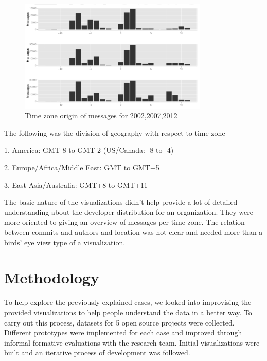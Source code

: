 \documentclass[double,12pt]{beavtex}
\begin{document}
\begin{figure}[!ht]
\centering
\includegraphics[width=90mm]{work2.png}
\caption{Time zone origin of messages for 2002,2007,2012}
\end{figure}

The following was the division of geography with respect to time zone -

1. America: GMT-8 to GMT-2 (US/Canada: -8 to -4)

2. Europe/Africa/Middle East: GMT to GMT+5

3. East Asia/Australia: GMT+8 to GMT+11


The basic nature of the visualizations didn't help provide a lot of detailed understanding about the developer distribution for an organization. They were more oriented to giving an
overview of messages per time zone. The relation between commits and authors and location was not clear and needed more than a birds' eye view type of a visualization.

\chapter{Methodology}
To help explore the previously explained cases, we looked into improvising the provided visualizations to help people understand the data in a better way. To carry out this process, datasets for 5 open source projects were collected. Different prototypes were implemented for each case and improved through informal formative evaluations with the research team. Initial visualizations were built and an iterative process of development was followed.
\end{document}
